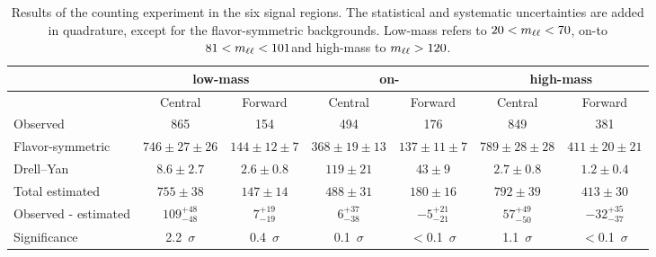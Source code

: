 
\begin{table}[hbtp]
 \renewcommand{\arraystretch}{1.3}
 \setlength{\belowcaptionskip}{6pt}
 \scriptsize
 \centering
 \caption{Results of the counting experiment in the six signal regions.
     The statistical and systematic uncertainties are added in quadrature, except for the flavor-symmetric backgrounds.
     Low-mass refers to $20 < m_{\ell\ell} < 70$\GeV, on-\Z to  $81 < m_{\ell\ell} < 101$\GeV and high-mass to $m_{\ell\ell} > 120$\GeV.
     }
  \label{tab:METresults2012}
  \begin{tabular}{l| cc | cc | cc}

    							& \multicolumn{2}{c}{low-mass} & \multicolumn{2}{c}{on-\Z} & \multicolumn{2}{c}{high-mass} \\ 

    \hline
                                &  Central        & Forward  &  Central  & Forward   &  Central        & Forward \\ 

    \hline
        Observed       &  865                   & 154              &  494            &  176       &   849           &   381    \\

    \hline
        Flavor-symmetric    & $746\pm27\pm26$        & $144\pm12\pm7$  &  $368\pm19\pm13$ & $137\pm11\pm7$ & $789\pm28\pm28$ & $411\pm20\pm21$ \\

            Drell--Yan          & $8.6\pm2.7$            & $2.6\pm0.8$      & $119\pm21$ & $43\pm9$ & $2.7\pm0.8$ & $1.2\pm0.4$ \\

    \hline
            Total estimated          & $755\pm38$            & $147\pm14$      & $488\pm31$ & $180\pm16$ & $792\pm39$ & $413\pm30$ \\

    \hline
         Observed - estimated  & $109^{+48}_{-48}$      & $7^{+19}_{-19}$ & $6^{+37}_{-38} $ & $-5^{+21}_{-21}$ & $57^{+49}_{-50}$ & $-32^{+35}_{-37} $ \\ 

    \hline
   Significance      & 2.2~$\sigma$    &  0.4~$\sigma$  & 0.1~$\sigma$ & $<$0.1~$\sigma$ & 1.1~$\sigma$ & $<$0.1~$\sigma$ \\ 


  \end{tabular}
\end{table}


